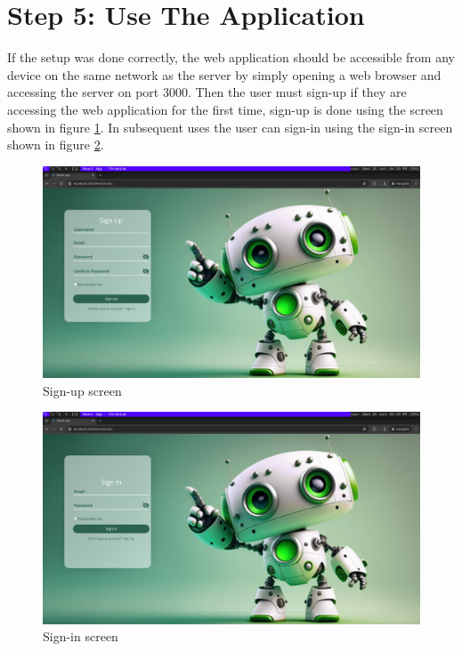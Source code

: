 \section{Step 5: Use The Application}
If the setup was done correctly, the web application should be accessible from any device on the same network as the server by simply opening a web browser and accessing the server on port 3000. Then the user must sign-up if they are accessing the web application for the first time, sign-up is done using the screen shown in figure \ref{fig:sign-up}. In subsequent uses the user can sign-in using the sign-in screen shown in figure \ref{fig:sign-in}.
\begin{figure}[h!]
	\centering
	\includegraphics[scale=0.2]{./Figures/WebApp/sign-up.png}
	\caption{Sign-up screen}
	\label{fig:sign-up}
\end{figure}
\begin{figure}[h!]
	\centering
	\includegraphics[scale=0.2]{./Figures/WebApp/sign-in.png}
	\caption{Sign-in screen}
	\label{fig:sign-in}
\end{figure}

\newpage

